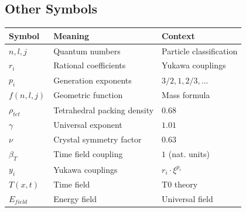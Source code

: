 \documentclass[12pt,a4paper]{report}
\begin{document}
\subsection{Other Symbols}
\begin{longtable}{lll}
	\toprule
	\textbf{Symbol} & \textbf{Meaning} & \textbf{Context} \\
	\midrule
	$n, l, j$ & Quantum numbers & Particle classification \\
	$r_i$ & Rational coefficients & Yukawa couplings \\
	$p_i$ & Generation exponents & $3/2, 1, 2/3, ...$ \\
	$f(n,l,j)$ & Geometric function & Mass formula \\
	$\rho_{tet}$ & Tetrahedral packing density & $0.68$ \\
	$\gamma$ & Universal exponent & $1.01$ \\
	$\nu$ & Crystal symmetry factor & $0.63$ \\
	$\beta_T$ & Time field coupling & $1$ (nat. units) \\
	$y_i$ & Yukawa couplings & $r_i \cdot \xi^{p_i}$ \\
	$T(x,t)$ & Time field & T0 theory \\
	$E_{field}$ & Energy field & Universal field \\
	\bottomrule
\end{longtable}
\normalsize	
\appendix
\end{document}
